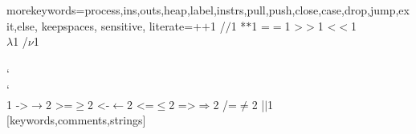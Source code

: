 %
  {morekeywords={process,ins,outs,heap,label,instrs,pull,push,close,case,drop,jump,exit,else},%
   keepspaces,%
   sensitive,%
   literate={+}{{$+$}}1 {/}{{$/$}}1 {*}{{$*$}}1 {=}{{$=$}}1
            {>}{{$>$}}1 {<}{{$<$}}1 {\\}{{$\lambda$}}1 {/}{{$\nu$}}1
            {\\\\}{{\char`\\\char`\\}}1
            {->}{{$\rightarrow$}}2 {>=}{{$\geq$}}2 {<-}{{$\leftarrow$}}2
            {<=}{{$\leq$}}2 {=>}{{$\Rightarrow$}}2 
            {/=}{{$\ne$}}2
            {|}{{$\mid$}}1
  }[keywords,comments,strings]%






\newcommand\Hs{\lstinline}
